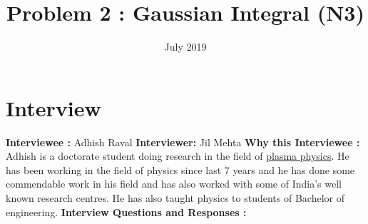 \documentclass{article}
\title{Problem 2 : Gaussian Integral (N3)}
\date{July 2019}
\begin{document}
\maketitle

\section{Interview}

\textbf{Interviewee : } Adhish Raval \hfill\break
\textbf{Interviewer: } Jil Mehta \hfill\break \break
\textbf{Why this Interviewee :} Adhish is a doctorate student doing research in the field of \underline {plasma physics}. He has been working in the field of physics since last 7 years and he has done some commendable work in his field and has also worked with some of India's well known research centres. He has also taught physics to students of Bachelor of engineering.\hfill\break\break
\textbf{Interview Questions and Responses :} \hfill\break\break
\end{document}
